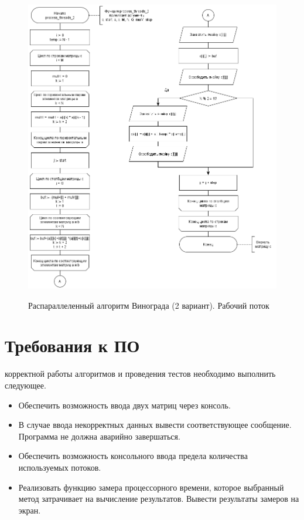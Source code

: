 \begin{figure}[pt!]
	\begin{center}
		{\includegraphics[scale = 0.6]{schemes/parall_2_work}}
		\caption{Распараллеленный алгоритм Винограда (2 вариант). Рабочий поток}
		\label{fig5:image}
	\end{center}
\end{figure}

\section{Требования к ПО}
 корректной работы алгоритмов и проведения тестов необходимо выполнить следующее.
\begin{itemize}
	\item Обеспечить возможность ввода двух матриц через консоль.
	\item В случае ввода некорректных данных вывести соответствующее сообщение. Программа не должна аварийно завершаться.
	\item Обеспечить возможность консольного ввода предела количества используемых потоков.
	\item Реализовать функцию замера процессорного времени, которое выбранный метод затрачивает на вычисление результатов. Вывести результаты замеров на экран.
\end{itemize}

